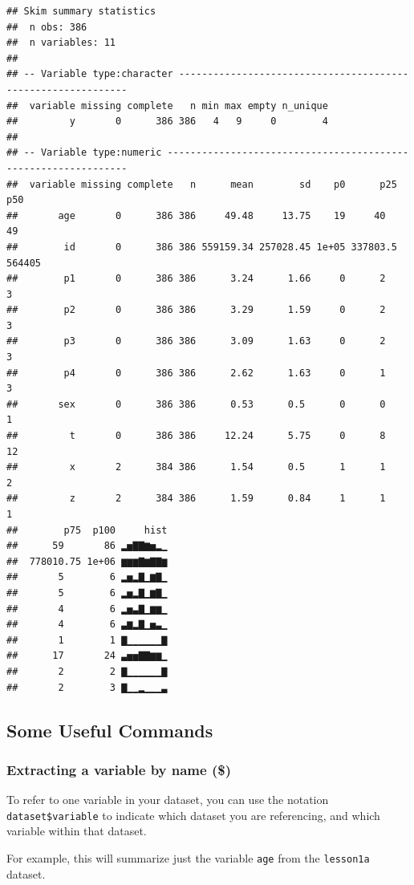 \documentclass[]{book}
\begin{document}
\begin{verbatim}
## Skim summary statistics
##  n obs: 386 
##  n variables: 11 
## 
## -- Variable type:character -------------------------------------------------------------
##  variable missing complete   n min max empty n_unique
##         y       0      386 386   4   9     0        4
## 
## -- Variable type:numeric ---------------------------------------------------------------
##  variable missing complete   n      mean        sd    p0      p25    p50
##       age       0      386 386     49.48     13.75    19     40       49
##        id       0      386 386 559159.34 257028.45 1e+05 337803.5 564405
##        p1       0      386 386      3.24      1.66     0      2        3
##        p2       0      386 386      3.29      1.59     0      2        3
##        p3       0      386 386      3.09      1.63     0      2        3
##        p4       0      386 386      2.62      1.63     0      1        3
##       sex       0      386 386      0.53      0.5      0      0        1
##         t       0      386 386     12.24      5.75     0      8       12
##         x       2      384 386      1.54      0.5      1      1        2
##         z       2      384 386      1.59      0.84     1      1        1
##        p75  p100     hist
##      59       86 ▂▅▇▇▆▅▂▁
##  778010.75 1e+06 ▆▆▆▇▆▇▇▆
##       5        6 ▂▅▂▇▁▆▇▁
##       5        6 ▂▅▂▇▁▆▇▁
##       4        6 ▂▅▃▇▁▆▆▁
##       4        6 ▃▆▂▇▁▅▃▁
##       1        1 ▇▁▁▁▁▁▁▇
##      17       24 ▃▅▅▇▇▆▆▁
##       2        2 ▇▁▁▁▁▁▁▇
##       2        3 ▇▁▁▂▁▁▁▃
\end{verbatim}

\hypertarget{some-useful-commands}{%
\subsection{Some Useful Commands}\label{some-useful-commands}}

\hypertarget{extracting-a-variable-by-name}{%
\subsubsection{Extracting a variable by name (\$)}\label{extracting-a-variable-by-name}}

To refer to one variable in your dataset, you can use the notation \texttt{dataset\$variable} to indicate which dataset you are referencing, and which variable within that dataset.

For example, this will summarize just the variable \texttt{age} from the \texttt{lesson1a} dataset.
\end{document}
